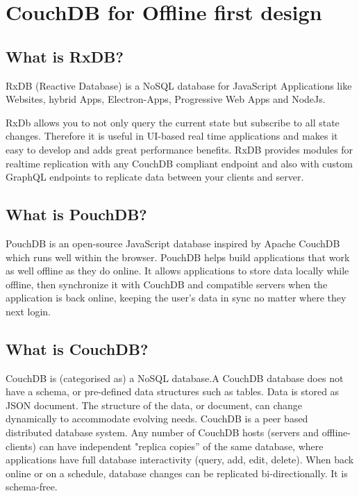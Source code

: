 \section{CouchDB for Offline first design}

\subsection{What is RxDB?}

RxDB (Reactive Database) is a NoSQL database for JavaScript Applications 
like Websites, hybrid Apps, Electron-Apps, Progressive Web Apps and NodeJs.

RxDb allows you to not only query the current state but subscribe to all state changes.
Therefore it is useful in UI-based real time applications and makes it easy to develop and adds great performance benefits.
RxDB provides modules for realtime replication with any CouchDB compliant endpoint and 
also with custom GraphQL endpoints to replicate data between your clients and server. 

\subsection{What is PouchDB?}

PouchDB is an open-source JavaScript database inspired by Apache CouchDB which runs well within the browser.
PouchDB helps build applications that work as well offline as they do online.
It allows applications to store data locally while offline, then synchronize it with CouchDB and compatible servers when the application is back online, keeping the user's data in sync no matter where they next login.

\subsection{What is CouchDB?}

CouchDB is (categorised as) a NoSQL database.A CouchDB database does not have a schema, or pre-defined data structures such as tables. Data is stored as JSON document. The structure of the data, or document, can change dynamically to accommodate evolving needs.  
CouchDB is a peer based distributed database system. Any number of CouchDB hosts (servers and offline-clients) can have independent "replica copies'' of the same database, where applications have full database interactivity (query, add, edit, delete). When back online or on a schedule, database changes can be replicated bi-directionally.
It is schema-free.

